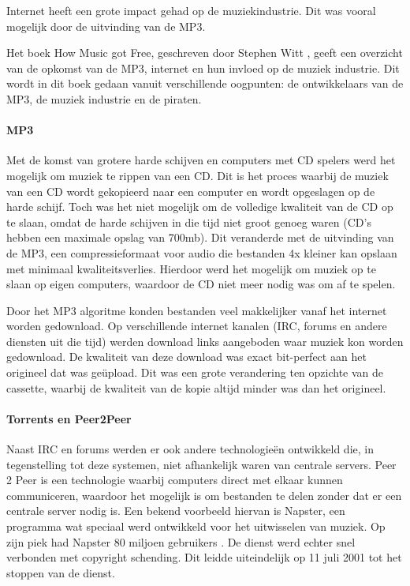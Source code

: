 Internet heeft een grote impact gehad op de muziekindustrie. Dit was vooral mogelijk door de uitvinding van de MP3.

Het boek How Music got Free, geschreven door Stephen Witt \citep{HowMusicGotFree}, geeft een overzicht van de opkomst van de MP3, internet en hun invloed op de muziek industrie. Dit wordt in dit boek gedaan vanuit verschillende oogpunten: de ontwikkelaars van de MP3, de muziek industrie en de piraten.

\paragraph*{MP3}
Met de komst van grotere harde schijven en computers met CD spelers werd het mogelijk om muziek te rippen van een CD. Dit is het proces waarbij de muziek van een CD wordt gekopieerd naar een computer en wordt opgeslagen op de harde schijf. Toch was het niet mogelijk om de volledige kwaliteit van de CD op te slaan, omdat de harde schijven in die tijd niet groot genoeg waren (CD's hebben een maximale opslag van 700mb). Dit veranderde met de uitvinding van de MP3, een compressieformaat voor audio die bestanden 4x kleiner kan opslaan met minimaal kwaliteitsverlies. Hierdoor werd het mogelijk om muziek op te slaan op eigen computers, waardoor de CD niet meer nodig was om af te spelen.

Door het MP3 algoritme konden bestanden veel makkelijker vanaf het internet worden gedownload. Op verschillende internet kanalen (IRC, forums en andere diensten uit die tijd) werden download links aangeboden waar muziek kon worden gedownload. De kwaliteit van deze download was exact bit-perfect aan het origineel dat was geüpload. Dit was een grote verandering ten opzichte van de cassette, waarbij de kwaliteit van de kopie altijd minder was dan het origineel.

\paragraph*{Torrents en Peer2Peer}
Naast IRC en forums werden er ook andere technologieën ontwikkeld die, in tegenstelling tot deze systemen, niet afhankelijk waren van centrale servers. Peer 2 Peer is een technologie waarbij computers direct met elkaar kunnen communiceren, waardoor het mogelijk is om bestanden te delen zonder dat er een centrale server nodig is. Een bekend voorbeeld hiervan is Napster, een programma wat speciaal werd ontwikkeld voor het uitwisselen van muziek. Op zijn piek had Napster 80 miljoen gebruikers \citep{gown2002requiem}. De dienst werd echter snel verbonden met copyright schending. Dit leidde uiteindelijk op 11 juli 2001 tot het stoppen van de dienst.

